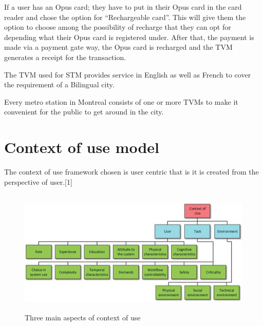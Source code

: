 \documentclass[12pt]{report}
\begin{document}
If a user has an Opus card; they have to put in their Opus card in the card reader and chose the option for “Rechargeable card”. This will give them the option to choose among the possibility of recharge that they can opt for depending what their Opus card is registered under. After that, the payment is made via a payment gate way, the Opus card is recharged and the TVM generates a receipt for the transaction.  

The TVM used for STM provides service in English as well as French to cover the requirement of a Bilingual city. 
 
Every metro station in Montreal consists of one or more TVMs to make it convenient for the public to get around in the city. 




\chapter{Context of use model}


The context of use framework chosen is user centric that is it is created from the perspective of user.[1]\par


\vspace{\baselineskip}

\vspace{\baselineskip}



\begin{figure}[H]
	\begin{Center}
		\includegraphics[width=5.21in,height=2.36in]{./p2_image1.jpeg}
	\end{Center}
	\caption{Three main aspects of context of use}
\end{figure}


\end{document}
